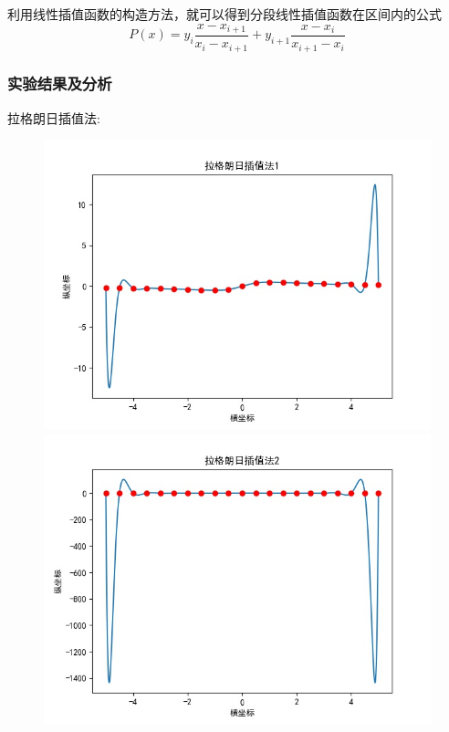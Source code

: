 \documentclass[UTF8]{ctexart}
\begin{document}
利用线性插值函数的构造方法，就可以得到分段线性插值函数在区间内的公式
$$
P(x)=y_{i} \frac{x-x_{i+1}}{x_{i}-x_{i+1}}+y_{i+1} \frac{x-x_{i}}{x_{i+1}-x_{i}}
$$
\subsubsection{实验结果及分析}
拉格朗日插值法:

\begin{figure}[h]
    \centering
    \begin{minipage}[t]{0.4\linewidth}
    \includegraphics[width=\linewidth]{Lg1.jpg}
    \end{minipage}%
    \begin{minipage}[t]{0.4\linewidth}
    \includegraphics[width=\linewidth]{Lg2.jpg}
    \end{minipage}
\end{figure}
\end{document}
